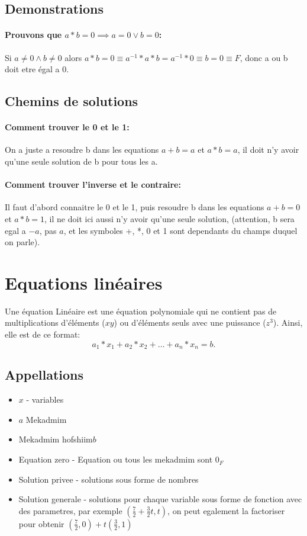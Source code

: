 \documentclass[12pt]{article}
\begin{document}
\subsection{Demonstrations}
 \paragraph{Prouvons que $a*b = 0 \implies a=0 \lor b=0$:}
   

Si $a \neq 0 \land b \neq 0$ alors $a*b=0 \equiv a^{-1}*a*b = a^{-1}*0 \equiv b = 0 \equiv F$, donc a ou b doit etre égal a 0.  

\subsection{Chemins de solutions}

\paragraph{Comment trouver le 0 et le 1:}
On a juste a resoudre b dans les equations $a+b = a$ et $a*b = a$, il doit n'y avoir qu'une seule solution de b pour tous les a.  

\paragraph{Comment trouver l'inverse et le contraire:} 
Il faut d'abord connaitre le 0 et le 1, puis resoudre b dans les equations $a+b = 0$ et $a*b = 1$, il ne doit ici aussi n'y avoir qu'une seule solution, (attention, b sera egal a $-a$, pas $a$, et les symboles +, *, 0 et 1 sont dependants du champs duquel on parle).
  
\section{Equations linéaires}
Une équation Linéaire est une équation polynomiale qui ne contient pas de multiplications d'éléments ($xy$) ou d'éléments seuls avec une puissance ($z^3$). Ainsi, elle est de ce format:
\[
  a_1 * x_1  + a_2 * x_2 + \ldots + a_n * x_n = b
.\]

\subsection{Appellations}
\begin{itemize}
  \item $x$ - variables
  \item $a$ Mekadmim
  \item Mekadmim hofshiim$b$ 
  \item  Equation zero - Equation ou tous les mekadmim sont $0_F$
  \item Solution privee - solutions sous forme de nombres
  \item Solution generale - solutions pour chaque variable sous forme de fonction avec des parametres, par exemple $(\frac{7}{2}+\frac{3}{2}t, t)$, on peut egalement la factoriser pour obtenir $(\frac{7}{2}, 0) + t(\frac{3}{2}, 1)$

\end{itemize}
\end{document}
